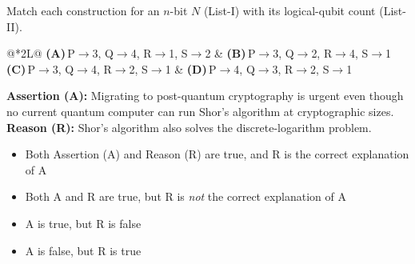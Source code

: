 \documentclass[11pt,a4paper]{article}
\newcommand{\optlabel}[1]{\textbf{(#1)}}
\newenvironment{qitem}[1]{\begin{list}{}{\setlength{\leftmargin}{3.3em}\setlength{\labelwidth}{3.1em}%
  \setlength{\labelsep}{0.2em}\setlength{\topsep}{3pt}\setlength{\parsep}{3pt}}\item[\textbf{Q.#1}\hfill]}{\end{list}}
\newcommand{\qsep}{\par\vspace{2pt}{\color{black!15}\hrule}\vspace{4pt}}
\begin{document}
\begin{qitem}{76}
Match each construction for an $n$-bit $N$ (List-I) with its logical-qubit count (List-II).
\par\smallskip{}
\par\smallskip\noindent\begin{tabularx}{\linewidth}{@{}*{2}{L}@{}}
\optlabel{A}\,P$\to$3, Q$\to$4, R$\to$1, S$\to$2 & \optlabel{B}\,P$\to$3, Q$\to$2, R$\to$4, S$\to$1 \\[3pt]
\optlabel{C}\,P$\to$3, Q$\to$4, R$\to$2, S$\to$1 & \optlabel{D}\,P$\to$4, Q$\to$3, R$\to$2, S$\to$1
\end{tabularx}
\end{qitem}
\qsep

\begin{qitem}{77}
\textbf{Assertion (A):} Migrating to post-quantum cryptography is urgent even though no current quantum computer can run Shor's algorithm at
cryptographic sizes.\\[1mm]
\textbf{Reason (R):} Shor's algorithm also solves the discrete-logarithm problem.
\begin{itemize}[leftmargin=2.6em, labelsep=0.4em, itemsep=2pt, topsep=3pt]
\item[\optlabel{A}] Both Assertion (A) and Reason (R) are true, and R is the correct explanation of A
\item[\optlabel{B}] Both A and R are true, but R is \emph{not} the correct explanation of A
\item[\optlabel{C}] A is true, but R is false
\item[\optlabel{D}] A is false, but R is true
\end{itemize}
\end{qitem}
\qsep
\end{document}
